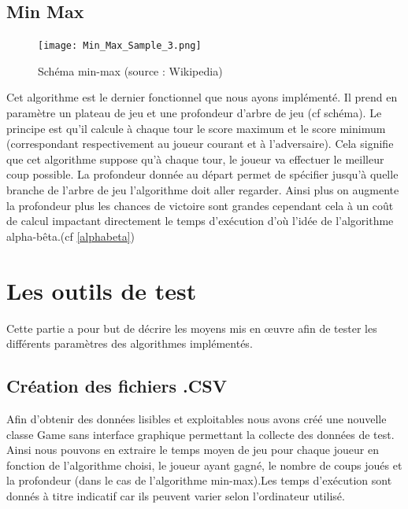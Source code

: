 \documentclass{report}
\begin{document}
		\section{Min Max}
		 \begin{figure}[!b]
             	    \caption{Schéma min-max (source : Wikipedia)}
             	    \label{minmaxWikipedia}
             	    \texttt{[image: Min\_Max\_Sample\_3.png]}
             	\end{figure}
        Cet algorithme est le dernier fonctionnel que nous ayons implémenté. Il prend en paramètre un plateau de jeu et une profondeur d'arbre de jeu (cf schéma). Le principe est qu'il calcule à chaque tour le score maximum et le score minimum (correspondant respectivement au joueur courant et à l'adversaire). Cela signifie que cet algorithme suppose qu'à chaque tour, le joueur va effectuer le meilleur coup possible. La profondeur donnée au départ permet de spécifier jusqu'à quelle branche de l'arbre de jeu l'algorithme doit aller regarder. Ainsi plus on augmente la profondeur plus les chances de victoire sont grandes cependant cela à un coût de calcul impactant directement le temps d'exécution d'où l'idée de l'algorithme alpha-bêta.(cf \ref{alphabeta})
	\chapter{Les outils de test}
	Cette partie a pour but de décrire les moyens mis en œuvre afin de tester les différents paramètres des algorithmes implémentés.
	\section{Création des fichiers .CSV}
	\label{fichierCSV}
	Afin d'obtenir des données lisibles et exploitables nous avons créé une nouvelle classe Game sans interface graphique permettant la collecte des données de test.
	Ainsi nous pouvons en extraire le temps moyen de jeu pour chaque joueur en fonction de l'algorithme choisi, le joueur ayant gagné,
	le nombre de coups joués et la profondeur (dans le cas de l'algorithme min-max).Les temps d'exécution sont donnés à titre indicatif car ils peuvent varier selon l'ordinateur utilisé.
\end{document}

